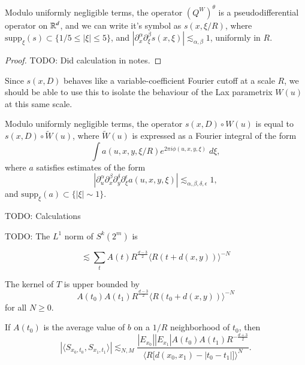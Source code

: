 \begin{lemma}
    Modulo uniformly negligible terms, the operator $(Q^W)^\theta$ is a pseudodifferential operator on $\operatorname{\mathbb{R}}^d$, and we can write it's symbol as $s(x, \xi / R)$, where $\text{supp}_\xi(s) \subset \{ 1/5 \leq |\xi| \leq 5 \}$, and $|\partial^\alpha_x \partial^\beta_\xi s(x,\xi)| \lesssim_{\alpha,\beta} 1$, uniformly in $R$.
\end{lemma}
\begin{proof}
    TODO: Did calculation in notes.
\end{proof}

Since $s(x,D)$ behaves like a variable-coefficient Fourier cutoff at a scale $R$, we should be able to use this to isolate the behaviour of the Lax parametrix $W(u)$ at this same scale.

\begin{lemma}
    Modulo uniformly negligible terms, the operator $s(x,D) \circ W(u)$ is equal to $s(x,D) \circ \tilde{W}(u)$, where $\tilde{W}(u)$ is expressed as a Fourier integral of the form
    \[ \int a(u,x,y,\xi / R) e^{2 \pi i \phi(u,x,y,\xi)}\; d\xi, \]
    where $a$ satisfies estimates of the form
    \[ |\partial_u^\alpha \partial_x^\beta \partial_y^\delta \partial_\xi^\epsilon a(u,x,y,\xi)| \lesssim_{\alpha,\beta,\delta,\epsilon} 1, \]
    and $\text{supp}_\xi(a) \subset \{ |\xi| \sim 1 \}$.
\end{lemma}

TODO: Calculations

TODO: The $L^1$ norm of $S^k(2^m)$ is

\[ \lesssim \sum_t A(t) R^{\frac{d-3}{2}} \langle R (t + d(x,y)) \rangle^{-N} \]

\begin{lemma}
    The kernel of $T$ is upper bounded by
    \[ A(t_0) A(t_1) R^{\frac{d-3}{2}} \langle R (t_0 + d(x,y)) \rangle^{-N} \]
    for all $N \geq 0$.
\end{lemma}



\begin{lemma}
    If $A(t_0)$ is the average value of $b$ on a $1/R$ neighborhood of $t_0$, then
    \[ |\langle {S\!}_{x_0,t_0}, {S\!}_{x_1,t_1} \rangle| \lesssim_{N,M} \frac{|E_{x_0}| |E_{x_1}| A(t_0) A(t_1) R^{- \frac{d+3}{2}}}{\Big\langle R \Big[ d(x_0,x_1) - |t_0 - t_1| \Big] \Big\rangle^N}. \]
\end{lemma}

